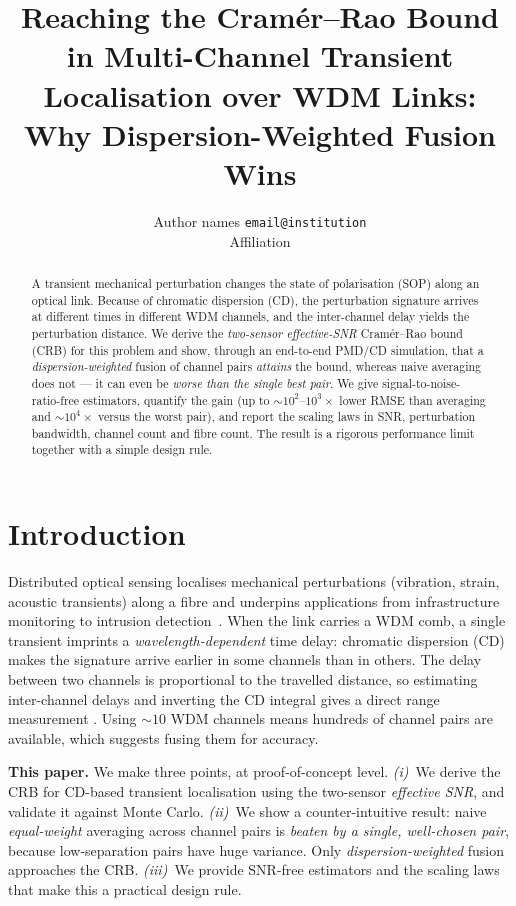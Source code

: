 \documentclass[10pt]{article}
\title{\vspace{-1.4em}\bfseries Reaching the Cram\'er--Rao Bound in Multi-Channel
Transient Localisation over WDM Links: Why Dispersion-Weighted Fusion Wins}
\author{\small Author names \quad \texttt{email@institution} \\ \small Affiliation}
\date{}
\begin{document}
\maketitle
\vspace{-2.0em}

\begin{abstract}
\noindent
A transient mechanical perturbation changes the state of polarisation (SOP)
along an optical link. Because of chromatic dispersion (CD), the perturbation
signature arrives at different times in different WDM channels, and the
inter-channel delay yields the perturbation distance. We derive the
\emph{two-sensor effective-SNR} Cram\'er--Rao bound (CRB) for this problem and
show, through an end-to-end PMD/CD simulation, that a \emph{dispersion-weighted}
fusion of channel pairs \emph{attains} the bound, whereas naive averaging does
not --- it can even be \emph{worse than the single best pair}. We give
signal-to-noise-ratio-free estimators, quantify the gain (up to
$\sim\!10^{2}$--$10^{3}\times$ lower RMSE than averaging and
$\sim\!10^{4}\times$ versus the worst pair), and report the scaling laws in
SNR, perturbation bandwidth, channel count and fibre count. The result is a
rigorous performance limit together with a simple design rule.
\end{abstract}

\section{Introduction}
\label{sec:intro}
Distributed optical sensing localises mechanical perturbations (vibration,
strain, acoustic transients) along a fibre and underpins applications from
infrastructure monitoring to intrusion detection~\cite{taylor1993das,he2022das}.
When the link carries a WDM comb, a single transient imprints a
\emph{wavelength-dependent} time delay: chromatic dispersion (CD) makes the
signature arrive earlier in some channels than in others. The delay between two
channels is proportional to the travelled distance, so estimating inter-channel
delays and inverting the CD integral gives a direct range measurement
\cite{sadler2003survey}. Using $\sim\!10$ WDM channels means hundreds of channel
pairs are available, which suggests fusing them for accuracy.

\smallskip
\noindent\textbf{This paper.} We make three points, at proof-of-concept level.
\emph{(i)}~We derive the CRB for CD-based transient localisation using the
two-sensor \emph{effective SNR}, and validate it against Monte Carlo.
\emph{(ii)}~We show a counter-intuitive result: naive \emph{equal-weight}
averaging across channel pairs is \emph{beaten by a single, well-chosen pair},
because low-separation pairs have huge variance. Only \emph{dispersion-weighted}
fusion approaches the CRB. \emph{(iii)}~We provide SNR-free estimators and the
scaling laws that make this a practical design rule.
\end{document}
